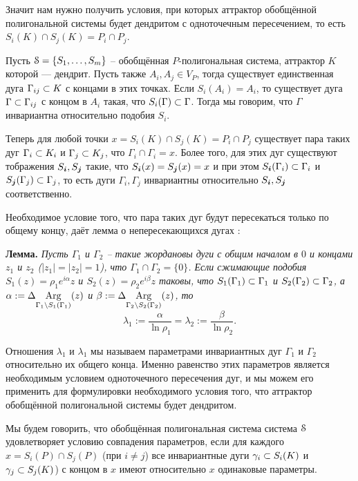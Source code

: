 
Значит нам нужно получить условия, при которых аттрактор обобщённой полигональной системы будет дендритом с одноточечным пересечением, то есть $S_i(K)\cap S_j(K)=P_i\cap P_j$.


Пусть ${\EuScript S}=\{S_1,\ldots,S_m\}$ -- обобщённая $P$-полигональная система, аттрактор $K$ которой --- дендрит.
Пусть также $A_i,A_j\in V_P$, тогда существует единственная дуга $\Gamma_{ij}\subset K$ с концами в этих точках.
Если $S_i(A_i)=A_i$, то существует дуга $\Gamma\subset\Gamma_{ij}$ с концом в $A_i$ такая, что $S_i(\Gamma)\subset\Gamma$.
Тогда мы говорим, что $\Gamma$ инвариантна относительно подобия $S_i$.

Теперь для любой точки $x=S_i(K)\cap S_j(K)=P_i\cap P_j$ существует пара таких дуг $\Gamma_i\subset K_i$ и $\Gamma_j\subset K_j$, что $\Gamma_i\cap\Gamma_i=x$.
Более того, для этих дуг существуют тображения $S_{\bm{i}}, S_{\bm{j}}$ такие, что $S_{\bm{i}}(x)=S_{\bm{j}}(x)=x$ и при этом $S_{\bm{i}}(\Gamma_i)\subset\Gamma_i$ и $S_{\bm{j}}(\Gamma_j)\subset\Gamma_j$, то есть дуги $\Gamma_i, \Gamma_j$ инвариантны относительно $S_{\bm{i}}, S_{\bm{j}}$ соответственно.

Необходимое условие того, что пара таких дуг будут пересекаться только по общему концу, даёт лемма о непересекающихся дугах \cite{ATK}:

{\bf Лемма.}
{\em Пусть $\Gamma_1$ и $\Gamma_2$ -- такие жордановы дуги с общим началом в $0$ и  концами $z_1$ и $z_2$ ($|z_1|=|z_2|=1$), что $\Gamma_1\cap\Gamma_2=\{0\}$.
Если сжимающие подобия $S_1(z)=\rho_1 e^{i\alpha}z$ и $S_2(z)=\rho_2 e^{i\beta}z$ таковы, что $S_1(\Gamma_1)\subset\Gamma_1$ и $S_2(\Gamma_2)\subset\Gamma_2$, 
а $\alpha:=\Delta\underset{{\Gamma_1\setminus S_1(\Gamma_1)}}{\mathrm {Arg}}(z)$ и $\beta:=\Delta\underset{{\Gamma_2\setminus S_2(\Gamma_2)}}{\mathrm {Arg}}(z)$, то
$$\lambda_1:=\dfrac{\alpha}{\ln\rho_1} = \lambda_2:=\dfrac{\beta}{\ln\rho_2}.$$}

Отношения $\lambda_1$ и $\lambda_1$ мы называем параметрами инвариантных дуг $\Gamma_1$ и $\Gamma_2$ относительно их общего конца.
Именно равенство этих параметров является необходимым условием одноточечного пересечения дуг, и мы можем его применить для формулировки необходимого условия того, что аттрактор обобщённой полигональной системы будет дендритом.

Мы будем говорить, что обобщённая полигональная система система ${\EuScript S}$ удовлетворяет условию совпадения параметров, если для каждого $x=S_i(P)\cap S_j(P)$ (при $i\neq j$) все инвариантные дуги $\gamma_i\subset S_i(K)$ и $\gamma_j\subset S_j(K)$) с концом в $x$ имеют относительно $x$ одинаковые параметры.

